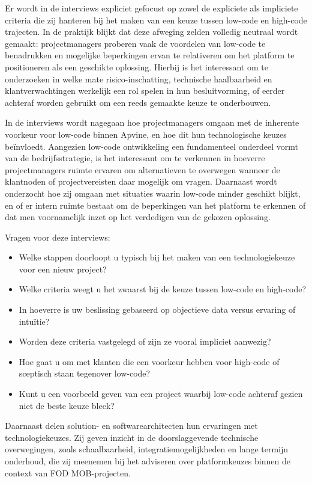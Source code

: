 Er wordt in de interviews expliciet gefocust op zowel de expliciete als impliciete criteria die zij hanteren bij het maken van een keuze tussen low-code en high-code trajecten. In de praktijk blijkt dat deze afweging zelden volledig neutraal wordt gemaakt: projectmanagers proberen vaak de voordelen van low-code te benadrukken en mogelijke beperkingen ervan te relativeren om het platform te positioneren als een geschikte oplossing. Hierbij is het interessant om te onderzoeken in welke mate risico-inschatting, technische haalbaarheid en klantverwachtingen werkelijk een rol spelen in hun besluitvorming, of eerder achteraf worden gebruikt om een reeds gemaakte keuze te onderbouwen.

In de interviews wordt nagegaan hoe projectmanagers omgaan met de inherente voorkeur voor low-code binnen Apvine, en hoe dit hun technologische keuzes beïnvloedt. Aangezien low-code ontwikkeling een fundamenteel onderdeel vormt van de bedrijfsstrategie, is het interessant om te verkennen in hoeverre projectmanagers ruimte ervaren om alternatieven te overwegen wanneer de klantnoden of projectvereisten daar mogelijk om vragen. Daarnaast wordt onderzocht hoe zij omgaan met situaties waarin low-code minder geschikt blijkt, en of er intern ruimte bestaat om de beperkingen van het platform te erkennen of dat men voornamelijk inzet op het verdedigen van de gekozen oplossing.

Vragen voor deze interviews: 
\begin{itemize} 
    \item Welke stappen doorloopt u typisch bij het maken van een technologiekeuze voor een nieuw project? 
    \item Welke criteria weegt u het zwaarst bij de keuze tussen low-code en high-code? 
    \item In hoeverre is uw beslissing gebaseerd op objectieve data versus ervaring of intuïtie? 
    \item Worden deze criteria vastgelegd of zijn ze vooral impliciet aanwezig? 
    \item Hoe gaat u om met klanten die een voorkeur hebben voor high-code of sceptisch staan tegenover low-code? 
    \item Kunt u een voorbeeld geven van een project waarbij low-code achteraf gezien niet de beste keuze bleek? 
\end{itemize}



Daarnaast delen solution- en softwarearchitecten hun ervaringen met technologiekeuzes. Zij geven inzicht in de doorslaggevende technische overwegingen, zoals schaalbaarheid, integratiemogelijkheden en lange termijn onderhoud, die zij meenemen bij het adviseren over platformkeuzes binnen de context van \gls{FOD MOB}-projecten.

